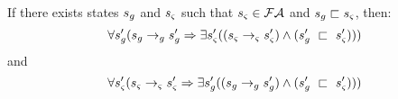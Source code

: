 \begin{lemma}
\label{lem:access}
%
If there exists states $s_{g}$ and $s_{\varsigma}$ such that $s_{\varsigma} \in \mathcal{FA}$ and $s_{g} \sqsubset s_{\varsigma}$, then:
\begin{equation}
\forall s_{g}^\prime ( s_{g} \rightarrow_{g} s_{g}^\prime \Rightarrow \exists s_{\varsigma}^\prime( (s_{\varsigma} \rightarrow_{\varsigma} s_{\varsigma}^\prime )\wedge (s_{g}^\prime\ \sqsubset\ s_{\varsigma}^\prime ))  )
\end{equation}
and
\begin{equation}
\forall s_{\varsigma}^\prime ( s_{\varsigma} \rightarrow_{\varsigma} s_{\varsigma}^\prime\Rightarrow \exists s_{g}^\prime( (s_{g} \rightarrow_{g} s_{g}^\prime )\wedge (s_{g}^\prime\ \sqsubset\ s_{\varsigma}^\prime ))  )
\end{equation}
\end{lemma}

